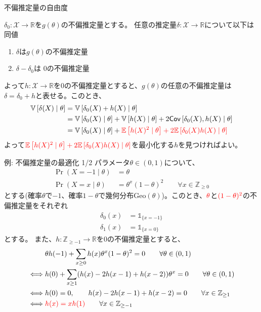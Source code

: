 \documentclass[lualatex,handout]{beamer}
\newcommand{\mycolor}[2]{%
  \begingroup
  \colorlet{currentcolor}{.}%
  \color{#1}#2%
  \color{currentcolor}%
  \endgroup
}
\newcommand{\emm}[1]{\mycolor{red}{#1}}
\newcommand{\expt}[1]{\mathbb{E}\left[#1\right]}
\newcommand{\var}[1]{\mathbb{V}\left[#1\right]}
\newcommand{\cov}[1]{\mathsf{Cov}\left[#1\right]}
\theoremstyle{definition}
\begin{document}
\begin{frame}{不偏推定量の自由度}
\begin{fact}
$\delta_0\colon\mathcal{X}\to\mathbb{R}$を$g(\theta)$の不偏推定量とする。
任意の推定量$\delta\colon\mathcal{X}\to\mathbb{R}$について以下は同値
\begin{enumerate}
\item $\delta$は$g(\theta)$の不偏推定量
\item $\delta-\delta_0$は $0$の不偏推定量
\end{enumerate}
\end{fact}
よって$h\colon\mathcal{X}\to\mathbb{R}$を$0$の不偏推定量とすると、$g(\theta)$の任意の不偏推定量は$\delta=\delta_0+h$と表せる。このとき、
\begin{align*}
\var{\delta(X)\mid\theta}&=
\var{\delta_0(X)+h(X)\mid\theta}\\
&= \var{\delta_0(X)\mid\theta}+\var{h(X)\mid\theta}+2\cov{\delta_0(X), h(X)\mid\theta}\\
&= \var{\delta_0(X)\mid\theta}+\emm{\expt{h(X)^2\mid\theta}+2\expt{\delta_0(X)h(X)\mid\theta}}
\end{align*}
よって$\emm{\expt{h(X)^2\mid\theta}+2\expt{\delta_0(X)h(X)\mid\theta}}$を最小化する$h$を見つければよい。
\end{frame}

\begin{frame}{例: 不偏推定量の最適化 1/2}
\small
パラメータ$\theta\in(0,1)$について、
\begin{align*}
\Pr(X=-1\mid \theta) &= \theta\\
\Pr(X=x\mid \theta) &= \theta^x (1-\theta)^2 \qquad\forall x\in\mathbb{Z}_{\ge 0}
\end{align*}
とする(確率$\theta$で$-1$、確率$1-\theta$で幾何分布$\mathrm{Geo}(\theta)$)。このとき、$\emm{\theta}$と$\emm{(1-\theta)^2}$の不偏推定量をそれぞれ
\begin{align*}
\delta_0(x) &=\mathbb{1}_{\{x = -1\}}\\
\delta_1(x) &=\mathbb{1}_{\{x = 0\}}
\end{align*}
とする。
また、$h\colon\mathbb{Z}_{\ge -1}\to\mathbb{R}$を$0$の不偏推定量とすると、
\begin{align*}
&\theta h(-1) + \sum_{x\ge 0} h(x) \theta^x (1-\theta)^2 = 0\qquad\forall \theta\in(0,1)\\
\iff&h(0) + \sum_{x\ge 1} (h(x)-2h(x-1)+h(x-2)) \theta^x = 0\qquad\forall \theta\in(0,1)\\
\iff&h(0)=0,\qquad h(x)-2h(x-1)+h(x-2) = 0\qquad\forall x\in\mathbb{Z}_{\ge1}\\
\iff&\emm{h(x)=xh(1)}\qquad\forall x\in\mathbb{Z}_{\ge-1}\\
\end{align*}
\end{frame}
\end{document}
